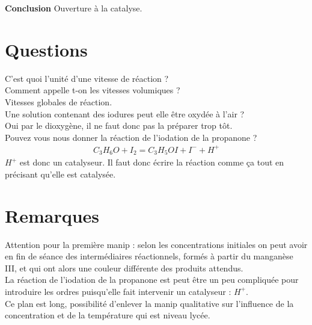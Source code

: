 \documentclass[12pt,prb,aps,epsf]{article}
\begin{document}
\textbf{Conclusion} Ouverture à la catalyse.

\section*{Questions}
C'est quoi l'unité d'une vitesse de réaction ?\\

Comment appelle t-on les vitesses volumiques ?\\
Vitesses globales de réaction.\\

Une solution contenant des iodures peut elle être oxydée à l'air ?\\
Oui par le dioxygène, il ne faut donc pas la préparer trop tôt.\\

Pouvez vous nous donner la réaction de l'iodation de la propanone ?
\begin{eqnarray}
C_3H_6O + I_2 = C_3H_5OI + I^- + H^+
\end{eqnarray}
$H^+$ est donc un catalyseur. Il faut donc écrire la réaction comme ça tout en précisant qu'elle est catalysée.\\



\section*{Remarques}
Attention pour la première manip : selon les concentrations initiales on peut avoir en fin de séance des intermédiaires réactionnels, formés à partir du manganèse III, et qui ont alors une couleur différente des produits attendus.\\

La réaction de l'iodation de la propanone est peut être un peu compliquée pour introduire les ordres puisqu'elle fait intervenir un catalyseur : $H^+$.\\

Ce plan est long, possibilité d'enlever la manip qualitative sur l'influence de la concentration et de la température qui est niveau lycée.

	
\end{document}
